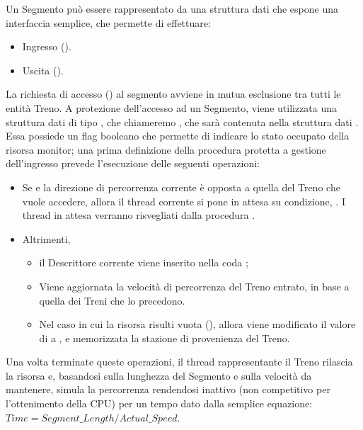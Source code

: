 		Un Segmento può essere rappresentato da una struttura dati  che espone una interfaccia semplice, che permette di effettuare:
			\begin{itemize}
				\item Ingresso ().
				\item Uscita ().
			\end{itemize}
		\begin{description}
			
			\item {}
			
			La richiesta di accesso () al segmento avviene in mutua esclusione tra tutti le entità Treno. A protezione dell'accesso ad un Segmento, viene utilizzata una struttura dati di tipo , che chiameremo , che sarà contenuta nella struttura dati . Essa possiede un flag booleano  che permette di indicare lo stato occupato della risorsa monitor; una prima definizione della procedura protetta  a gestione dell'ingresso prevede l'esecuzione delle seguenti operazioni:
			 
			 \begin{itemize}
			 	\item Se  e la direzione di percorrenza corrente è opposta a quella del Treno che vuole accedere, allora il thread corrente si pone in attesa su condizione, . I thread in attesa verranno risvegliati dalla procedura .
			 	\item Altrimenti, 
			 		\begin{itemize}
			 			\item il Descrittore corrente viene inserito nella coda ;
					 	\item Viene aggiornata la velocità di percorrenza del Treno entrato, in base a quella dei Treni che lo precedono.
					 	\item Nel caso in cui la risorsa risulti vuota (), allora viene modificato il valore di  a  , e memorizzata la stazione di provenienza del Treno.
					 \end{itemize}
			\end{itemize}
			
			Una volta terminate queste operazioni, il thread rappresentante il Treno rilascia la risorsa e, basandosi sulla lunghezza del Segmento e sulla velocità da mantenere, simula la percorrenza rendendosi inattivo (non competitivo per l'ottenimento della CPU) per un tempo dato dalla semplice equazione: $ Time = Segment\_Length / Actual\_Speed $.
			

\end{description}
